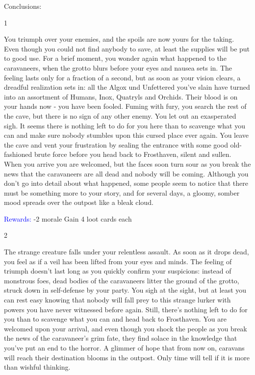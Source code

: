 \documentclass[fontsize=11pt]{scrartcl}
\begin{document}
	\begin{multicols*}{3}
		\begin{center}
		  {\myfont\LARGE{\textcolor{OliveGreen}{Conclusions:}}}
		\end{center}
		\begin{center}
		  {\myfont\large{\textcolor{OliveGreen}{1}}}
		\end{center}
		\footnotesize{You triumph over your enemies, and the spoils are now yours for the taking. Even though you could not find anybody to save, at least the supplies will be put to good use. For a brief moment, you wonder again what happened to the caravaneers, when the grotto blurs before your eyes and nausea sets in. The feeling lasts only for a fraction of a second, but as soon as your vision clears, a dreadful realization sets in: all the Algox und Unfettered you’ve slain have turned into an assortment of Humans, Inox, Quatryls and Orchids. Their blood is on your hands now - you have been fooled. Fuming with fury, you search the rest of the cave, but there is no sign of any other enemy. You let out an exasperated sigh. It seems there is nothing left to do for you here than to scavenge what you can and make sure nobody stumbles upon this cursed place ever again.\newline\newline
You leave the cave and vent your frustration by sealing the entrance with some good old-fashioned brute force before you head back to Frosthaven, silent and sullen. When you arrive you are welcomed, but the faces soon turn sour as you break the news that the caravaneers are all dead and nobody will be coming. Although you don’t go into detail about what happened, some people seem to notice that there must be something more to your story, and for several days, a gloomy, somber mood spreads over the outpost like a bleak cloud.}
		\begin{center}
		  {\myfont\normalsize{\textcolor{Blue}{Rewards:}}}\newline
		  \footnotesize{-2 morale\newline
Gain 4 loot cards each}
		\end{center}
		\begin{center}
		  {\myfont\large{\textcolor{OliveGreen}{2}}}
		\end{center}
		\footnotesize{The strange creature falls under your relentless assault. As soon as it drops dead, you feel as if a veil has been lifted from your eyes and minds. The feeling of triumph doesn’t last long as you quickly confirm your suspicions: instead of monstrous foes, dead bodies of the caravaneers litter the ground of the grotto, struck down in self-defense by your party. You sigh at the sight, but at least you can rest easy knowing that nobody will fall prey to this strange lurker with powers you have never witnessed before again. Still, there’s nothing left to do for you than to scavenge what you can and head back to Frosthaven. You are welcomed upon your arrival, and even though you shock the people as you break the news of the caravaneer’s grim fate, they find solace in the knowledge that you’ve put an end to the horror. A glimmer of hope that from now on, caravans will reach their destination blooms in the outpost. Only time will tell if it is more than wishful thinking.}

\end{multicols*}
\end{document}
